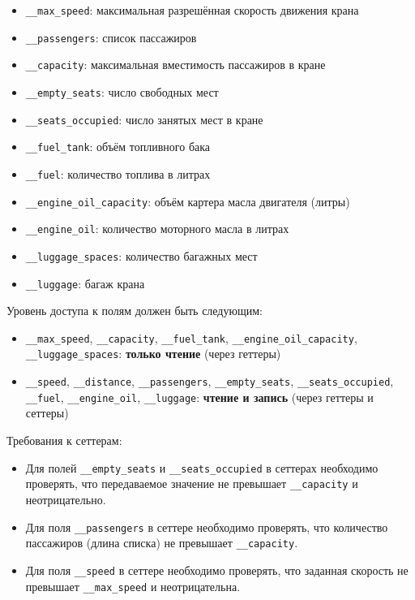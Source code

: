 \begin{enumerate}
\begin{itemize}
    \item \texttt{\_\_max\_speed}: максимальная разрешённая скорость движения крана  
    \item \texttt{\_\_passengers}: список пассажиров  
    \item \texttt{\_\_capacity}: максимальная вместимость пассажиров в кране  
    \item \texttt{\_\_empty\_seats}: число свободных мест  
    \item \texttt{\_\_seats\_occupied}: число занятых мест в кране  
    \item \texttt{\_\_fuel\_tank}: объём топливного бака  
    \item \texttt{\_\_fuel}: количество топлива в литрах  
    \item \texttt{\_\_engine\_oil\_capacity}: объём картера масла двигателя (литры)  
    \item \texttt{\_\_engine\_oil}: количество моторного масла в литрах  
    \item \texttt{\_\_luggage\_spaces}: количество багажных мест  
    \item \texttt{\_\_luggage}: багаж крана  
\end{itemize}
Уровень доступа к полям должен быть следующим:
\begin{itemize}
    \item \texttt{\_\_max\_speed}, \texttt{\_\_capacity}, \texttt{\_\_fuel\_tank}, \texttt{\_\_engine\_oil\_capacity}, \texttt{\_\_luggage\_spaces}: \textbf{только чтение} (через геттеры)  
    \item \texttt{\_\_speed}, \texttt{\_\_distance}, \texttt{\_\_passengers}, \texttt{\_\_empty\_seats}, \texttt{\_\_seats\_occupied}, \texttt{\_\_fuel}, \texttt{\_\_engine\_oil}, \texttt{\_\_luggage}: \textbf{чтение и запись} (через геттеры и сеттеры)
\end{itemize}
Требования к сеттерам:
\begin{itemize}
    \item Для полей \texttt{\_\_empty\_seats} и \texttt{\_\_seats\_occupied} в сеттерах необходимо проверять, что передаваемое значение не превышает \texttt{\_\_capacity} и неотрицательно.  
    \item Для поля \texttt{\_\_passengers} в сеттере необходимо проверять, что количество пассажиров (длина списка) не превышает \texttt{\_\_capacity}.  
    \item Для поля \texttt{\_\_speed} в сеттере необходимо проверять, что заданная скорость не превышает \texttt{\_\_max\_speed} и неотрицательна.  

\end{itemize}
\end{enumerate}
